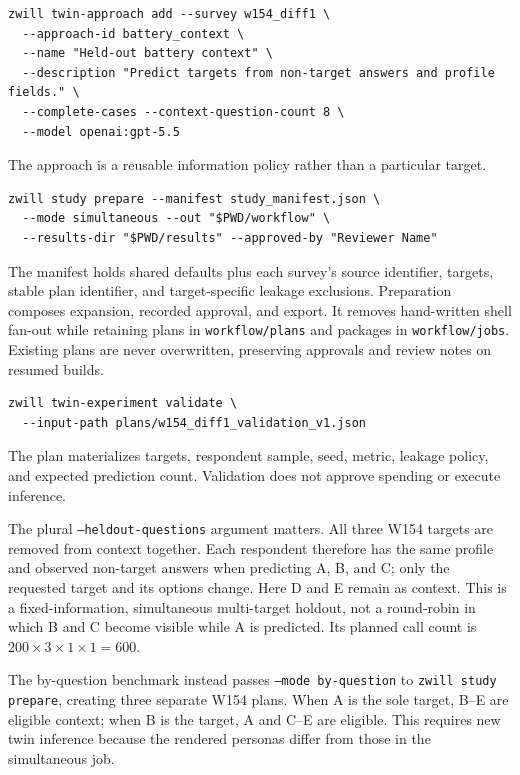 \documentclass[11pt]{article}
\begin{document}
\begin{lstlisting}[style=shell]
zwill twin-approach add --survey w154_diff1 \
  --approach-id battery_context \
  --name "Held-out battery context" \
  --description "Predict targets from non-target answers and profile fields." \
  --complete-cases --context-question-count 8 \
  --model openai:gpt-5.5
\end{lstlisting}
The approach is a reusable information policy rather than a particular target.

\begin{lstlisting}[style=shell]
zwill study prepare --manifest study_manifest.json \
  --mode simultaneous --out "$PWD/workflow" \
  --results-dir "$PWD/results" --approved-by "Reviewer Name"
\end{lstlisting}
The manifest holds shared defaults plus each survey's source identifier,
targets, stable plan identifier, and target-specific leakage exclusions.
Preparation composes expansion, recorded approval, and export. It removes
hand-written shell fan-out while retaining plans in \texttt{workflow/plans} and
packages in \texttt{workflow/jobs}. Existing plans are never overwritten,
preserving approvals and review notes on resumed builds.

\begin{lstlisting}[style=shell]
zwill twin-experiment validate \
  --input-path plans/w154_diff1_validation_v1.json
\end{lstlisting}
The plan materializes targets, respondent sample, seed, metric, leakage policy,
and expected prediction count. Validation does not approve spending or execute
inference.

The plural \texttt{--heldout-questions} argument matters. All three W154
targets are removed from context together. Each respondent therefore has the
same profile and observed non-target answers when predicting A, B, and C; only
the requested target and its options change. Here D and E remain as context.
This is a fixed-information, simultaneous multi-target holdout, not a
round-robin in which B and C become visible while A is predicted. Its planned
call count is $200\times3\times1\times1=600$.

The by-question benchmark instead passes \texttt{--mode by-question} to
\texttt{zwill study prepare}, creating three separate W154
plans. When A is the sole target,
B--E are eligible context; when B is the target, A and C--E are eligible. This
requires new twin inference because the rendered personas differ from those in
the simultaneous job.
\end{document}
